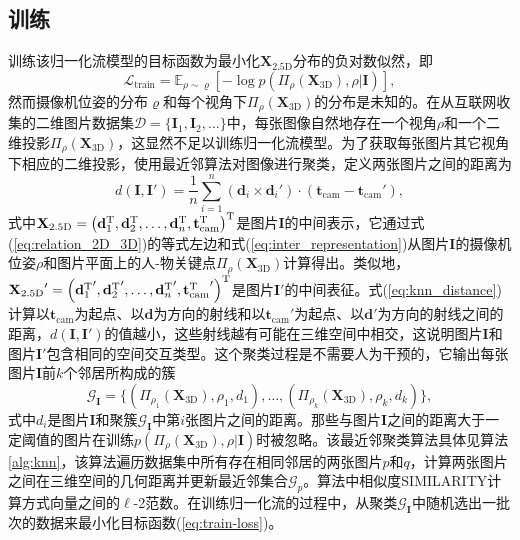 \subsection{训练}
训练该归一化流模型的目标函数为最小化$\mathbf{X}_{\text{2.5D}}$分布的负对数似然，即
\begin{equation}\label{eq:train-loss}
	\mathcal{L}_{\text{train}} = \mathbb{E}_{\rho \sim \varrho}[- \log p(\Pi_\rho(\mathbf{X}_{\text{3D}}), \rho|\mathbf{I})],
\end{equation}
然而摄像机位姿的分布$\varrho$和每个视角下$\Pi_\rho(\mathbf{X}_{\text{3D}})$的分布是未知的。在从互联网收集的二维图片数据集$\mathcal{D} = \{\mathbf{I}_1, \mathbf{I}_2, \dots\}$中，每张图像自然地存在一个视角$\rho$和一个二维投影$\Pi_\rho(\mathbf{X}_{\text{3D}})$，这显然不足以训练归一化流模型。为了获取每张图片其它视角下相应的二维投影，使用最近邻算法\citep{Dong2011EfficientKN}对图像进行聚类，定义两张图片之间的距离为
\begin{equation}\label{eq:knn_distance}
	d(\mathbf{I}, \mathbf{I}') = \frac{1}{n}\sum_{i=1}^n (\mathbf{d}_i \times \mathbf{d}_i') \cdot (\mathbf{t}_{\text{cam}} - \mathbf{t}_{\text{cam}}'),
\end{equation}
式中$\mathbf{X}_{\text{2.5D}} = \left( \mathbf{d}_1^{\rm{T}}, \mathbf{d}_2^{\rm{T}}, \dots, \mathbf{d}_n^{\rm{T}}, \mathbf{t}_{\text{cam}}^{\rm{T}} \right)^{\rm{T}}$是图片$\mathbf{I}$的中间表示，它通过式(\ref{eq:relation_2D_3D})的等式左边和式(\ref{eq:inter_representation})从图片$\mathbf{I}$的摄像机位姿$\rho$和图片平面上的人-物关键点$\Pi_\rho(\mathbf{X}_{\text{3D}})$计算得出。类似地，${\mathbf{X}_{\text{2.5D}}}' = \left( {\mathbf{d}_1^{\rm{T}}}', {\mathbf{d}_2^{\rm{T}}}', \dots, {\mathbf{d}_n^{\rm{T}}}', {\mathbf{t}_{\text{cam}}^{\rm{T}}}' \right)^{\rm{T}}$是图片$\mathbf{I}'$的中间表征。式(\ref{eq:knn_distance})计算以$\mathbf{t}_{\text{cam}}$为起点、以$\mathbf{d}$为方向的射线和以$\mathbf{t}_{\text{cam}}'$为起点、以$\mathbf{d}'$为方向的射线之间的距离，$d(\mathbf{I}, \mathbf{I}')$的值越小，这些射线越有可能在三维空间中相交，这说明图片$\mathbf{I}$和图片$\mathbf{I}'$包含相同的空间交互类型。这个聚类过程是不需要人为干预的，它输出每张图片$\mathbf{I}$前$k$个邻居所构成的簇
\begin{equation}
	\mathcal{G}_{\mathbf{I}} = \{(\Pi_{\rho_1}(\mathbf{X}_{\text{3D}}), \rho_1, d_1), \dots, (\Pi_{\rho_k}(\mathbf{X}_{\text{3D}}), \rho_k, d_k)\},
\end{equation}
式中$d_i$是图片$\mathbf{I}$和聚簇$\mathcal{G}_{\mathbf{I}}$中第$i$张图片之间的距离。那些与图片$\mathbf{I}$之间的距离大于一定阈值的图片在训练$p(\Pi_\rho(\mathbf{X}_{\text{3D}}), \rho | \mathbf{I})$时被忽略。该最近邻聚类算法具体见算法\ref{alg:knn}，该算法遍历数据集中所有存在相同邻居的两张图片$p$和$q$，计算两张图片之间在三维空间的几何距离并更新最近邻集合$\mathcal{G}_p$。算法中相似度SIMILARITY计算方式向量之间的$\ell$-2范数。在训练归一化流的过程中，从聚类$\mathcal{G}_{\mathbf{I}}$中随机选出一批次的数据来最小化目标函数(\ref{eq:train-loss})。

